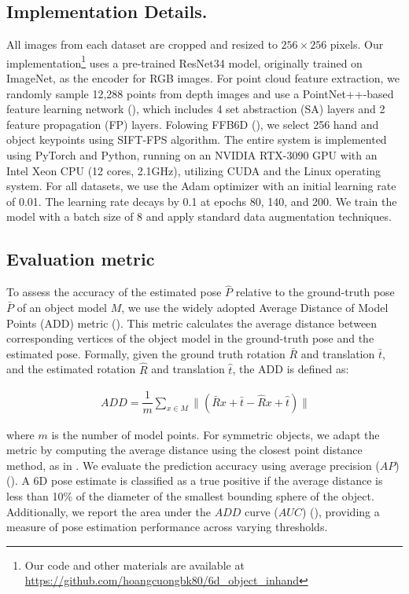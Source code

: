 \subsection{\textbf{Implementation Details.}}

All images from each dataset are cropped and resized to $256 \times 256$ pixels. Our implementation\footnote{Our code and other materials are available at \url{https://github.com/hoangcuongbk80/6d_object_inhand}} uses a pre-trained ResNet34 model, originally trained on ImageNet, as the encoder for RGB images. For point cloud feature extraction, we randomly sample 12,288 points from depth images and use a PointNet++-based feature learning network (\cite{qi2017pointnet++}), which includes 4 set abstraction (SA) layers and 2 feature propagation (FP) layers. Folowing FFB6D (\cite{he2021ffb6d}), we select 256 hand and object keypoints using SIFT-FPS algorithm. The entire system is implemented using PyTorch and Python, running on an NVIDIA RTX-3090 GPU with an Intel Xeon CPU (12 cores, 2.1GHz), utilizing CUDA and the Linux operating system. For all datasets, we use the Adam optimizer with an initial learning rate of 0.01. The learning rate decays by 0.1 at epochs 80, 140, and 200. We train the model with a batch size of 8 and apply standard data augmentation techniques.

\subsection{Evaluation metric}
\label{sec:metric}

To assess the accuracy of the estimated pose $\hat{P}$ relative to the ground-truth pose $\bar{P}$ of an object model $M$, we use the widely adopted Average Distance of Model Points (ADD) metric (\cite{hinterstoisser2012model}). This metric calculates the average distance between corresponding vertices of the object model in the ground-truth pose and the estimated pose. Formally, given the ground truth rotation $\bar{R}$ and translation $\bar{t}$, and the estimated rotation $\hat{R}$ and translation $\hat{t}$, the ADD is defined as:

\begin{align}
\  ADD = \dfrac{1}{m} \sum_{x \in M} \parallel (\bar{R}x+ \bar{t} - \hat{R}x+ \hat{t}) \parallel
\end{align}

\noindent where $m$ is the number of model points. For symmetric objects, we adapt the metric by computing the average distance using the closest point distance method, as in \cite{bregier2017symmetry}. We evaluate the prediction accuracy using average precision ($AP$) (\cite{bregier2017symmetry}). A 6D pose estimate is classified as a true positive if the average distance is less than 10\% of the diameter of the smallest bounding sphere of the object. Additionally, we report the area under the $ADD$ curve ($AUC$) (\cite{wang2019densefusion}), providing a measure of pose estimation performance across varying thresholds.

